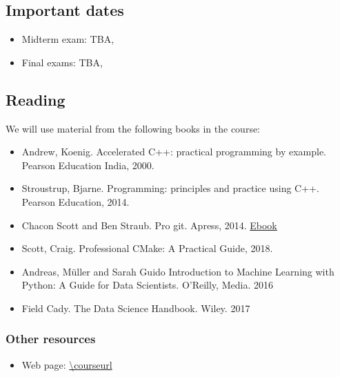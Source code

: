 \documentclass[11pt,letterpaper]{article}
\begin{document}
\subsection*{Important dates}
\begin{itemize}
\item Midterm exam:  TBA, \courselocation
\item Final exams: TBA, \courselocation
\end{itemize}
\subsection*{Reading}

We will use material from the following books in the course:

\begin{itemize}
\item Andrew, Koenig. Accelerated C++: practical programming by example. Pearson Education India, 2000.
\item Stroustrup, Bjarne. Programming: principles and practice using C++. Pearson Education, 2014.
\item Chacon Scott and Ben Straub. Pro git. Apress, 2014. \href{https://github.com/progit/progit2/releases/download/2.1.146/progit.pdf}{Ebook}
\item Scott, Craig. Professional CMake: A Practical Guide, 2018.
\item Andreas, M\"uller and Sarah Guido  Introduction to Machine Learning with Python: A Guide for Data Scientists. O'Reilly, Media. 2016
\item Field Cady. The Data Science Handbook. Wiley. 2017
\end{itemize}

\subsubsection*{Other resources}

\begin{itemize}
\item Web page: \url{\courseurl}
\end{itemize}
\end{document}
